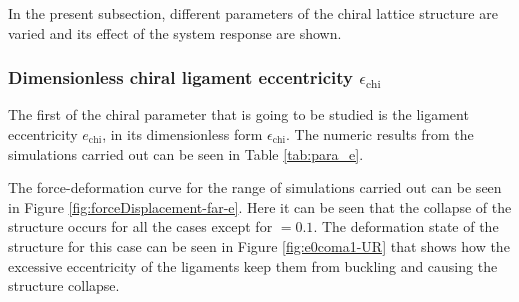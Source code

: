     In the present subsection, different parameters of the chiral lattice structure are varied and its effect of the system response are shown.

    \subsubsection{Dimensionless chiral ligament eccentricity $\epsilon_{\mathrm{chi}}$}

      The first of the chiral parameter that is going to be studied is the ligament eccentricity $e_{\mathrm{chi}}$, in its dimensionless form $\epsilon_{\mathrm{chi}}$. The numeric results from the simulations carried out can be seen in Table \ref{tab:para_e}.

      The force-deformation curve for the range of simulations carried out can be seen in Figure \ref{fig:forceDisplacement-far-e}. Here it can be seen that the collapse of the structure occurs for all the cases except for \chie$= 0.1$. The deformation state of the structure for this case can be seen in Figure \ref{fig:e0coma1-UR} that shows how the excessive eccentricity of the ligaments keep them from buckling and causing the structure collapse.

